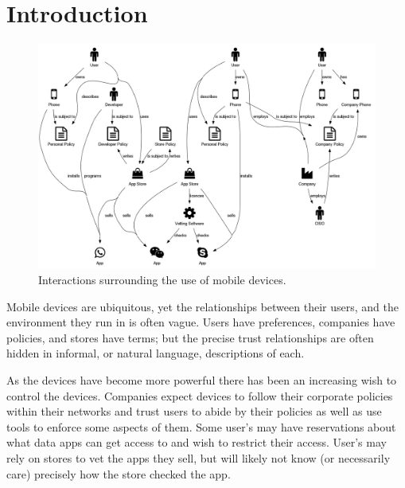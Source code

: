\documentclass[thesis.tex]{subfiles}
\begin{document}
\chapter{Introduction}

%

\begin{figure}
  \centering
  \includegraphics[width=\linewidth]{figures/mobile-ecosystem.png}
  \caption{Interactions surrounding the use of mobile devices.}
  \label{fig:mobile-ecosystem}
\end{figure}

Mobile devices are ubiquitous, yet the relationships between their users, and
the environment they run in is often vague. Users have preferences,
companies have policies, and stores have terms; but the precise trust
relationships are often hidden in informal, or natural language, descriptions of
each.

As the devices have become more powerful there has been an increasing wish to
control the devices. Companies expect devices to follow their corporate policies
within their networks and trust users to abide by their policies as well as use
tools to enforce some aspects of them. Some user's may have reservations about
what data apps can get access to and wish to restrict their access. User's may rely on
stores to vet the apps they sell, but will likely not know (or necessarily care)
precisely how the store checked the app.
\end{document}
